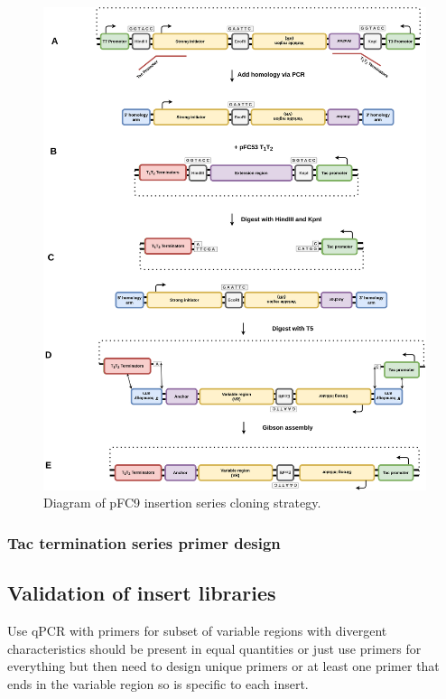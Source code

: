 \documentclass[11pt]{article}
\begin{document}
\begin{figure}[H]
	\includegraphics[width=15cm]{images/cloning_diagrams/construct_diagrams-Tac-termination-series.png}
	\centering
	\caption{Diagram of pFC9 insertion series cloning strategy.}
\end{figure}

\subsubsection{Tac termination series primer design}

\subsection{Validation of insert libraries}

Use qPCR with primers for subset of variable regions with divergent characteristics should be present in equal quantities or just use primers for everything but then need to design unique primers or at least one primer that ends in the variable region so is specific to each insert. 
\end{document}
